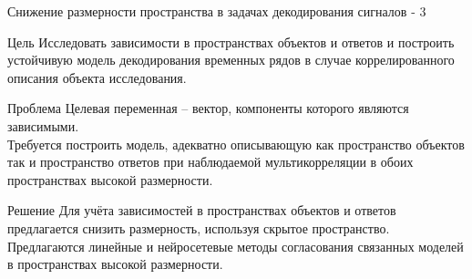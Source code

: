 \documentclass[10pt]{beamer}
\begin{document}
\begin{frame}{Снижение размерности пространства в задачах декодирования сигналов - 3}
	\begin{block}{Цель}
		Исследовать зависимости в пространствах объектов и ответов и построить устойчивую модель декодирования временных рядов в случае коррелированного описания объекта исследования.
	\end{block}
	\begin{block}{Проблема}
		Целевая переменная -- вектор, компоненты которого являются зависимыми. \\
		Требуется построить модель, адекватно описывающую как пространство объектов так и пространство ответов при наблюдаемой мультикорреляции в обоих пространствах высокой размерности. 
	\end{block}
	\begin{block}{Решение}
		Для учёта зависимостей в пространствах объектов и ответов предлагается снизить размерность, используя скрытое пространство. Предлагаются линейные и нейросетевые методы согласования связанных моделей в пространствах высокой размерности.
	\end{block}
\end{frame}
\end{document}
